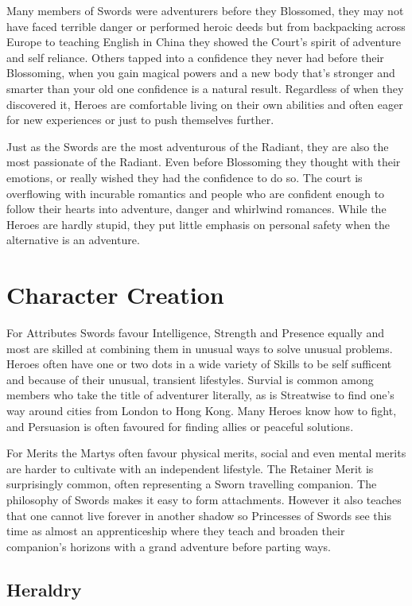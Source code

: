 Many members of Swords were adventurers before they Blossomed, they may not have faced terrible danger or performed heroic deeds but from backpacking across Europe to teaching English in China they showed the Court's spirit of adventure and self reliance. Others tapped into a confidence they never had before their Blossoming, when you gain magical powers and a new body that's stronger and smarter than your old one confidence is a natural result. Regardless of when they discovered it, Heroes are comfortable living on their own abilities and often eager for new experiences or just to push themselves further. 

Just as the Swords are the most adventurous of the Radiant, they are also the most passionate of the Radiant. Even before Blossoming they thought with their emotions, or really wished they had the confidence to do so. The court is overflowing with incurable romantics and people who are confident enough to follow their hearts into adventure, danger and whirlwind romances. While the Heroes are hardly stupid, they put little emphasis on personal safety when the alternative is an adventure. 

\section*{Character Creation}

For Attributes Swords favour Intelligence, Strength and Presence equally and most are skilled at combining them in unusual ways to solve unusual problems. Heroes often have one or two dots in a wide variety of Skills to be self sufficent and because of their unusual, transient lifestyles. Survial is common among members who take the title of adventurer literally, as is Streatwise to find one's way around cities from London to Hong Kong. Many Heroes know how to fight, and Persuasion is often favoured for finding allies or peaceful solutions. 

For Merits the Martys often favour physical merits, social and even mental merits are harder to cultivate with an independent lifestyle. The Retainer Merit is surprisingly common, often representing a Sworn travelling companion. The philosophy of Swords makes it easy to form attachments. However it also teaches that one cannot live forever in another shadow so Princesses of Swords see this time as almost an apprenticeship where they teach  and broaden their companion's horizons with a grand adventure before parting ways.

\subsection*{Heraldry}

